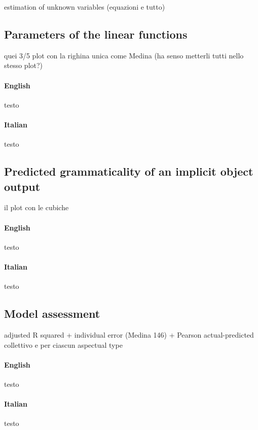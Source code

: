 estimation of unknown variables (equazioni e tutto)


\subsection{Parameters of the linear functions} 

quei 3/5 plot con la righina unica come Medina (ha senso metterli tutti nello stesso plot?)

\paragraph{English} testo

\paragraph{Italian} testo


\subsection{Predicted grammaticality of an implicit object output} 

il plot con le cubiche

\paragraph{English} testo

\paragraph{Italian} testo


\subsection{Model assessment} 

adjusted R squared + 
individual error (Medina 146) +
Pearson actual-predicted collettivo e per ciascun aspectual type

\paragraph{English} testo

\paragraph{Italian} testo


